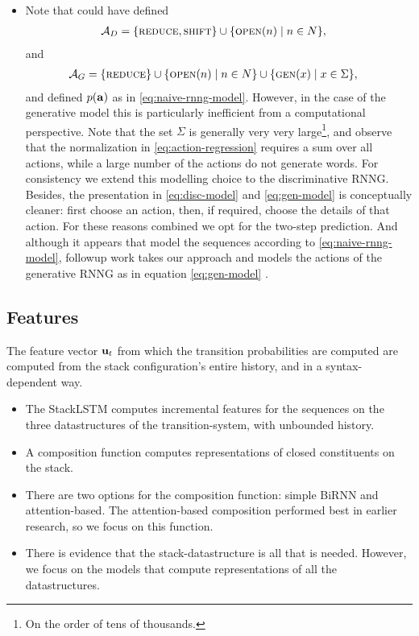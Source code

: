 \begin{itemize}
  \item Note that could have defined
  \begin{align*}
    \mathcal{A}_D &= \{ \textsc{reduce}, \textsc{shift} \} \cup \{ \textsc{open}(n) \mid n \in N \},
  \end{align*}
  and
  \begin{align*}
    \mathcal{A}_G &= \{ \textsc{reduce} \} \cup \{ \textsc{open}(n) \mid n \in N \} \cup \{ \textsc{gen}(x) \mid x \in \Sigma \},
  \end{align*}
  and defined $p(\mathbf{a})$ as in \ref{eq:naive-rnng-model}. However, in the case of the generative model this is particularly inefficient from a computational perspective. Note that the set $\Sigma$ is generally very very large\footnote{On the order of tens of thousands.}, and observe that the normalization in \ref{eq:action-regression} requires a sum over all actions, while a large number of the actions do not generate words. For consistency we extend this modelling choice to the discriminative RNNG. Besides, the presentation in \ref{eq:disc-model} and \ref{eq:gen-model} is conceptually cleaner: first choose an action, then, if required, choose the details of that action. For these reasons combined we opt for the two-step prediction. And although it appears that \citet{Dyer+2016:RNNG} model the sequences according to \ref{eq:naive-rnng-model}, followup work takes our approach and models the actions of the generative RNNG as in equation \ref{eq:gen-model} \citep{Hale+2018:beam}.

\end{itemize}

\subsection{Features}
The feature vector $\mathbf{u}_t$ from which the transition probabilities are computed are computed from the stack configuration's entire history, and in a syntax-dependent way.
\begin{itemize}
  \item The StackLSTM computes incremental features for the sequences on the three datastructures of the transition-system, with unbounded history.
  \item A composition function computes representations of closed constituents on the stack.
  \item There are two options for the composition function: simple BiRNN and attention-based. The attention-based composition performed best in earlier research, so we focus on this function.
  \item There is evidence that the stack-datastructure is all that is needed. However, we focus on the models that compute representations of all the datastructures.
\end{itemize}

